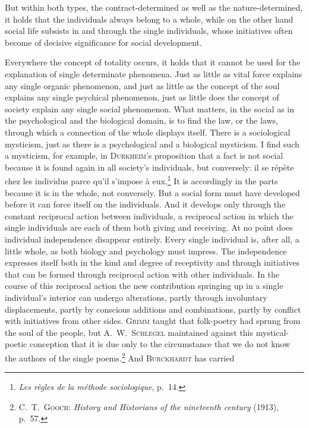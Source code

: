 \documentclass[12pt]{book}
\newcommand{\opage}[1]{\marginnote{\footnotesize\textit{[#1]}}}
\begin{document}
But within both types, the contract-determined as well as the nature-determined, it holds
that the individuals always belong to a whole, while on the other hand social life
subsists in and through the single individuals, whose initiatives often become of decisive
significance for social development.

Everywhere the concept of totality occurs, it holds that it cannot be used for the
explanation of single determinate phenomena. Just as little as vital force explains any
single organic phenomenon, and just as little as the concept of the soul explains any
single psychical phenomenon, just as little does the concept of society explain any single
social phenomenon. What matters, in the social as in the psychological and the biological
domain, is to find the law, or the laws, through which a connection of the whole displays
itself. There is a sociological \opage{62}mysticism, just as there is a psychological and a
biological mysticism. I find such a mysticism, for example, in \textsc{Durkheim}'s
proposition that a fact is not social because it is found again in all society's
individuals, but conversely: il se répète chez les individus parce qu'il s'impose à
eux.\footnote{\textit{Les règles de la méthode sociologique}, p.\ 14.} It is accordingly
in the parts because it is in the whole, not conversely. But a social form must have
developed before it can force itself on the individuals. And it develops only through the
constant reciprocal action between individuals, a reciprocal action in which the single
individuals are each of them both giving and receiving. At no point does individual
independence disappear entirely. Every single individual is, after all, a little whole, as
both biology and psychology must impress. The independence expresses itself both in the
kind and degree of receptivity and through initiatives that can be formed through
reciprocal action with other individuals. In the course of this reciprocal action the new
contribution springing up in a single individual's interior can undergo alterations,
partly through involuntary displacements, partly by conscious additions and combinations,
partly by conflict with initiatives from other sides. \textsc{Grimm} taught that folk-poetry
had sprung from the soul of the people, but \textsc{A.\ W.\ Schlegel} maintained against
this mystical-poetic conception that it is due only to the circumstance that we do not know
the authors of the single poems.\footnote{\textsc{C.\ T.\ Gooch}: \textit{History and
Historians of the nineteenth century} (1913), p.\ 57.} And \textsc{Burckhardt} has carried
\end{document}
